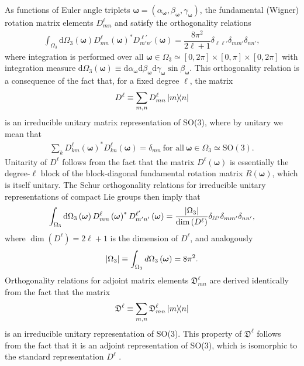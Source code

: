 \documentclass[notitlepage,twocolumn]{revtex4-2}
\renewcommand{\t}{\text} %
\newcommand{\f}[2]{\dfrac{#1}{#2}} %
\newcommand{\p}[1]{\left(#1\right)} %
\renewcommand{\v}{\bm} %
\newcommand{\1}{\mathds{1}}
\newcommand{\D}{\mathfrak{D}}
\renewcommand{\d}{\text{d}}
\newcommand{\SO}{\text{SO}}
\begin{document}
As functions of Euler angle triplets $\v\omega=\p{\alpha_{\v\omega},\beta_{\v\omega},\gamma_{\v\omega}}$, the fundamental (Wigner) rotation matrix elements $D_{mn}^\ell$ and satisfy the orthogonality relations \cite{brown2003rotational}
\begin{align}
  \int_{\Omega_3} \d\Omega_3\p{\v\omega}
  D^{\ell}_{mn}\p{\v\omega}^* D^{\ell'}_{m'n'}\p{\v\omega}
  = \f{8\pi^2}{2\ell+1} \delta_{\ell\ell'} \delta_{mm'} \delta_{nn'},
  \label{eq:orthogonal}
\end{align}
where integration is performed over all $\v\omega\in\Omega_3\simeq[0,2\pi]\times[0,\pi]\times[0,2\pi]$ with integration measure $\d\Omega_3\p{\v\omega}\equiv\d\alpha_{\v\omega} \d\beta_{\v\omega} \d\gamma_{\v\omega} \sin\beta_{\v\omega}$.
This orthogonality relation is a consequence of the fact that, for a fixed degree $\ell$, the matrix
\begin{align}
  D^\ell \equiv \sum_{m,n} D^\ell_{mn} \op{m}{n}
\end{align}
is an irreducible unitary matrix representation of SO(3), where by unitary we mean that
\begin{align}
  \sum_k D^\ell_{km}\p{\v\omega}^* D^\ell_{kn}\p{\v\omega} = \delta_{mn}
  ~\t{for all}~\v\omega\in\Omega_3\simeq\SO(3).
\end{align}
Unitarity of $D^\ell$ follows from the fact that the matrix $D^\ell\p{\v\omega}$ is essentially the degree-$\ell$ block of the block-diagonal fundamental rotation matrix $R\p{\v\omega}$, which is itself unitary.
The Schur orthogonality relations for irreducible unitary representations of compact Lie groups then imply that \cite{cornwell1997group}
\begin{align}
  \int_{\Omega_3} \d\Omega_3\p{\v\omega}
  D^{\ell}_{mn}\p{\v\omega}^* D^{\ell'}_{m'n'}\p{\v\omega}
  = \f{\abs{\Omega_3}}{\dim\p{D^\ell}}
  \delta_{\ell\ell'} \delta_{mm'} \delta_{nn'},
  \label{eq:ortho_full_apndx}
\end{align}
where $\dim\p{D^\ell}=2\ell+1$ is the dimension of $D^\ell$, and analogously
\begin{align}
  \abs{\Omega_3} \equiv \int_{\Omega_3} d\Omega_3\p{\v\omega} = 8\pi^2.
\end{align}
Orthogonality relations for adjoint matrix elements $\D^\ell_{mn}$ are derived identically from the fact that the matrix
\begin{align}
  \D^\ell \equiv \sum_{m,n} \D^\ell_{mn} \op{m}{n}
\end{align}
is an irreducible unitary representation of SO(3).
This property of $\D^\ell$ follows from the fact that it is an adjoint representation of SO(3), which is isomorphic to the standard representation $D^\ell$ \cite{hall2015lie}.
\end{document}
